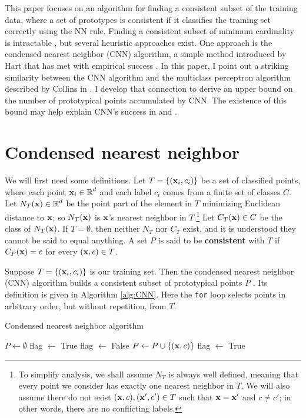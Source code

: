 \documentclass[preprint]{elsarticle}
\newcommand{\R}{ \mbox{${\mathbb R}$}}
\begin{document}
This paper focuses on an algorithm for finding a consistent subset of the training data, where a set of prototypes is consistent if it classifies the training set correctly using the NN rule. Finding a consistent subset of minimum cardinality is intractable \cite{Wilfong}, but several heuristic approaches exist. One approach is the condensed nearest neighbor (CNN) algorithm, a simple method introduced by Hart \cite{HartCNN} that has met with empirical success \cite{Angiulli}\cite{Wilson}. In this paper, I point out a striking similarity between the CNN algorithm and the multiclass perceptron algorithm described by Collins in \cite{CollinsPerceptron}. I develop that connection to derive an upper bound on the number of prototypical points accumulated by CNN. 
The existence of this bound may help explain CNN's success in \cite{Angiulli} and \cite{Wilson}.

\section{Condensed nearest neighbor}
We will first need some definitions. Let $T = \{ ({\bf x}_i, c_i) \}$ be a set of classified points, where each point ${\bf x}_i \in \R^d$ and each label $c_i$ comes from a finite set of classes $C$.
Let $N_T({\bf x}) \in \R^d$ be the point part of the element in $T$ minimizing Euclidean distance to ${\bf x}$; so $N_T({\bf x})$ is ${\bf x}$'s nearest neighbor in $T$.\footnote{To simplify analysis, we shall assume $N_T$ is always well defined, meaning that every point we consider has exactly one nearest neighbor in $T$. We will also assume there do not exist $({\bf x},c),({\bf x}',c') \in T$ such that ${\bf x} = {\bf x}'$ and $c \neq c'$; in other words, there are no conflicting labels.} Let $C_T({\bf x}) \in C$ be the class of $N_T({\bf x})$. If $T = \emptyset$, then neither $N_T$ nor $C_T$ exist, and it is understood they cannot be said to equal anything. A set $P$ is said to be \textbf{consistent} with $T$ if $C_P({\bf x}) = c$ for every $({\bf x},c) \in T$.

Suppose $T = \{({\bf x}_i,c_i )\}$ is our training set. Then the condensed nearest neighbor (CNN) algorithm builds a consistent subset of prototypical points $P$ \cite{HartCNN}. Its definition is given in Algorithm \ref{alg:CNN}. Here the \texttt{for} loop selects points in arbitrary order, but without repetition, from $T$.

\begin{algorithm}
\caption{Condensed nearest neighbor algorithm}
\label{alg:CNN}
\begin{algorithmic}
\STATE $P \leftarrow \emptyset$
\STATE flag $\leftarrow$ True
	\STATE flag $\leftarrow$ False
			\STATE $P \leftarrow P \cup \{({\bf x} , c)\}$
			\STATE flag $\leftarrow$ True
		\ENDIF
	\ENDFOR
\ENDWHILE
\end{algorithmic}
\end{algorithm}
\end{document}
